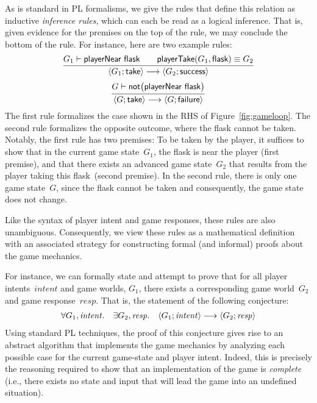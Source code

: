 As is standard in PL formalisms, we give the rules that define this
relation as inductive \emph{inference rules}, which can each be read
as a logical inference.  That is, given evidence for the premises on
the top of the rule, we may conclude the bottom of the rule.
%
For instance, here are two example rules:
\[
\infer{
  \GameStep{G_1}{\ctake}{G_2}{\textsf{success}}
}{ 
  G_1 \vdash \textsf{playerNear}~\textsf{flask}
  \quad
  \quad
  \textsf{playerTake}(G_1,\textsf{flask}) \equiv G_2
}
\]
\[
\infer{
  \GameStep{G}{\ctake}{G}{\textsf{failure}}
}{
  G \vdash \textsf{not}\big( \textsf{playerNear}~\textsf{flask} \big)
}
\]
The first rule formalizes the case shown in the RHS of
Figure~\ref{fig:gameloop}.
%
The second rule formalizes the opposite outcome, where the flask
cannot be taken.
%
Notably, the first rule has two premises: To be taken by the player,
it suffices to show that in the current game state~$G_1$, the flask is
near the player (first premise), and that there exists an advanced
game state~$G_2$ that results from the player taking this flask~(second premise).
%
In the second rule, there is only one game state~$G$, since the flask
cannot be taken and consequently, the game state does not change.

Like the syntax of player intent and game responses, these rules are
also unambiguous.
%
Consequently, we view these rules as a mathematical definition with an
associated strategy for constructing formal (and informal) proofs
about the game mechanics.

For instance, we can formally state and attempt to prove that for all
player intents~$\mathit{intent}$ and game worlds, $G_1$, there exists
a corresponding game world~$G_2$ and game response~$\mathit{resp}$.
%
That is, the statement of the following conjecture:
\[
\begin{array}{ccc}
\forall G_1, \mathit{intent}.
&
\exists G_2, \mathit{resp}.
&\left< G_1; \mathit{intent} \right> \longrightarrow \left< G_2; \mathit{resp} \right>
\end{array}
\]
Using standard PL techniques, the proof of this conjecture gives rise
to an abstract algorithm that implements the game mechanics by
analyzing each possible case for the current game-state and player
intent.
%
Indeed, this is precisely the reasoning required to show that an
implementation of the game is \emph{complete} (i.e., there exists no
state and input that will lead the game into an undefined situation).

